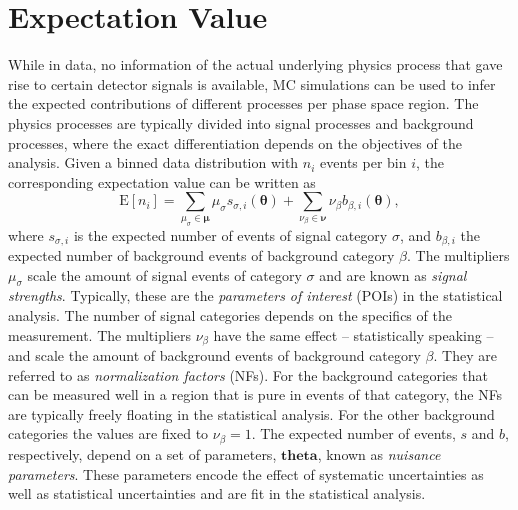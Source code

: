\section{Expectation Value}
While in data, no information of the actual underlying physics process that gave rise to certain detector signals is available, MC simulations can be used to infer the expected contributions of different processes per phase space region.
The physics processes are typically divided into signal processes and background processes, where the exact differentiation depends on the objectives of the analysis.
Given a binned data distribution with $n_i$ events per bin $i$, the corresponding expectation value can be written as
\begin{equation}
    \text{E}[n_i] = \sum_{\mu_\sigma \in \mathbf{\mu}} \mu_\sigma s_{\sigma,i}(\mathbf{\theta}) + \sum_{\nu_\beta \in \mathbf{\nu}} \nu_\beta b_{\beta,i}(\mathbf{\theta}),
\end{equation}
where $s_{\sigma, i}$ is the expected number of events of signal category $\sigma$, and $b_{\beta,i}$ the expected number of background events of background category $\beta$.
The multipliers $\mu_\sigma$ scale the amount of signal events of category $\sigma$ and are known as \emph{signal strengths}. Typically, these are the \emph{parameters of interest} (POIs) in the statistical analysis. The number of signal categories depends on the specifics of the measurement. The multipliers $\nu_\beta$ have the same effect -- statistically speaking -- and scale the amount of background events of background category $\beta$. They are referred to as \emph{normalization factors} (NFs). For the background categories that can be measured well in a region that is pure in events of that category, the NFs are typically freely floating in the statistical analysis. For the other background categories the values are fixed to $\nu_\beta = 1$. 
The expected number of events, $s$ and $b$, respectively, depend on a set of parameters, $\mathbf{theta}$, known as \emph{nuisance parameters}. These parameters encode the effect of systematic uncertainties as well as statistical uncertainties and are fit in the statistical analysis.


